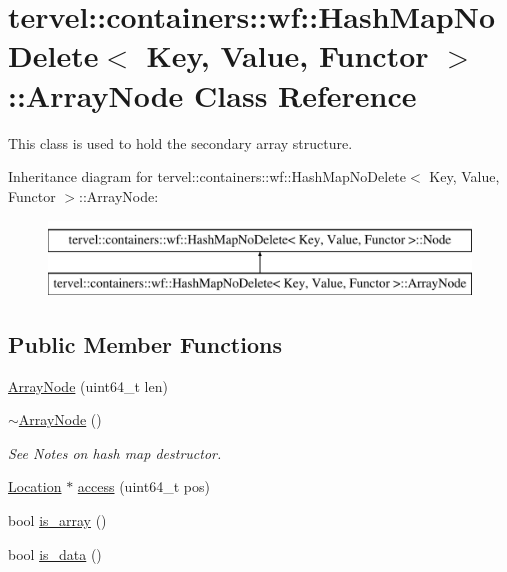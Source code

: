 \hypertarget{classtervel_1_1containers_1_1wf_1_1_hash_map_no_delete_1_1_array_node}{}\section{tervel\+:\+:containers\+:\+:wf\+:\+:Hash\+Map\+No\+Delete$<$ Key, Value, Functor $>$\+:\+:Array\+Node Class Reference}
\label{classtervel_1_1containers_1_1wf_1_1_hash_map_no_delete_1_1_array_node}


This class is used to hold the secondary array structure.  


Inheritance diagram for tervel\+:\+:containers\+:\+:wf\+:\+:Hash\+Map\+No\+Delete$<$ Key, Value, Functor $>$\+:\+:Array\+Node\+:\begin{figure}[H]
\begin{center}
\leavevmode
\includegraphics[height=2.000000cm]{classtervel_1_1containers_1_1wf_1_1_hash_map_no_delete_1_1_array_node}
\end{center}
\end{figure}
\subsection*{Public Member Functions}
\begin{DoxyCompactItemize}
\item 
\hyperlink{classtervel_1_1containers_1_1wf_1_1_hash_map_no_delete_1_1_array_node_ac45e67621163d45bf45f5bcc0b6f39f4}{Array\+Node} (uint64\+\_\+t len)
\item 
\hyperlink{classtervel_1_1containers_1_1wf_1_1_hash_map_no_delete_1_1_array_node_ab8e4a7e0ec552f5426083c4559a2d366}{$\sim$\+Array\+Node} ()
\begin{DoxyCompactList}\small\item\em See Notes on hash map destructor. \end{DoxyCompactList}\item 
\hyperlink{classtervel_1_1containers_1_1wf_1_1_hash_map_no_delete_af5b18c3806eb5b2d39693075d8c70ade}{Location} $\ast$ \hyperlink{classtervel_1_1containers_1_1wf_1_1_hash_map_no_delete_1_1_array_node_a405b0e610ce284c037bae98e64239599}{access} (uint64\+\_\+t pos)
\item 
bool \hyperlink{classtervel_1_1containers_1_1wf_1_1_hash_map_no_delete_1_1_array_node_a11f011931040dfd98938b073006cb04b}{is\+\_\+array} ()
\item 
bool \hyperlink{classtervel_1_1containers_1_1wf_1_1_hash_map_no_delete_1_1_array_node_a049ba7f928ab0c87be2e0466f8d29a1b}{is\+\_\+data} ()
\end{DoxyCompactItemize}
